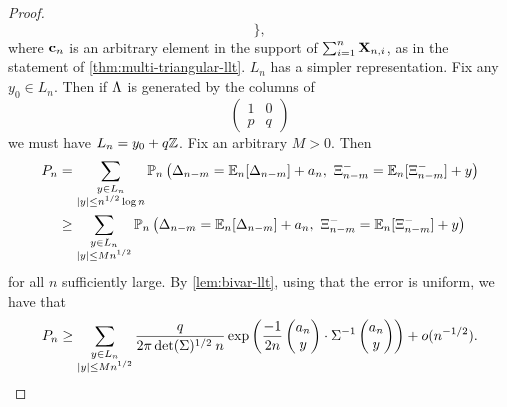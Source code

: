 \begin{proof}
\begin{equation*}
            \Big\},
    \end{equation*}
    where ${\mathbf c}_n$ is an arbitrary element in the support of $\sum_{i=1}^n {\mathbf X}_{n, i}$, as in the statement of \cref{thm:multi-triangular-llt}. 
    $L_n$ has a simpler representation. Fix any $y_0 \in L_n$. Then if $\Lambda$ is generated by the columns of
    \begin{equation*}
        \begin{pmatrix}
            1 & 0 \\
            p & q
        \end{pmatrix}
    \end{equation*}
    we must have $L_n = y_0 + q{\mathbb Z}$. Fix an arbitrary $M > 0$. Then
    \begin{align*}
        P_n &= \sum_{\substack{y \in L_n \\ \abs{y} \leq n^{1/2} \log n}} \mathbb P_n \left( \Delta_{n-m} = \E_n[\Delta_{n-m}] + a_n, \ \Xi^-_{n-m} = \E_n[\Xi^-_{n-m}] + y \right) \\
        &\geq \sum_{\substack{y \in L_n \\ \abs{y} \leq M n^{1/2}}} \mathbb P_n \left( \Delta_{n-m} = \E_n[\Delta_{n-m}] + a_n, \ \Xi^-_{n-m} = \E_n[\Xi^-_{n-m}] + y \right)
    \end{align*}
    for all $n$ sufficiently large. By \cref{lem:bivar-llt}, using that the error is uniform, we have that
    \begin{equation*}
        P_n \geq \sum_{\substack{y \in L_n \\ \lvert y\rvert \leq M n^{1/2}}} 
         \frac{q}{2\pi \det(\Sigma)^{1/2} \: n} \exp\left( 
            \frac{-1}{2n} \begin{pmatrix} a_n \\ y \end{pmatrix} \cdot \Sigma^{-1} \begin{pmatrix} a_n \\ y \end{pmatrix}
         \right)
         + o( n^{-1/2} ).
    \end{equation*}


\end{proof}
